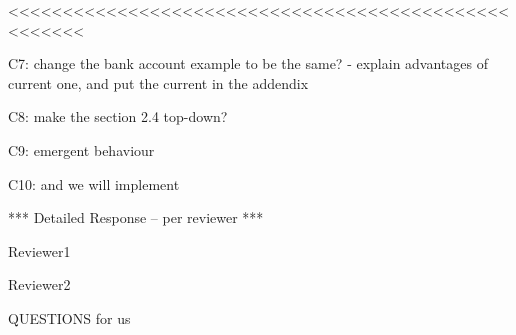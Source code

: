 <<<<<<<<<<<<<<<<<<<<<<<<<<<<<<<<<<<<<<<<<<<<<<<<<<<<<

C7: change the bank account example to be the same?
- explain advantages of current one, and put the current in the addendix

C8: make the section 2.4 top-down?

C9: emergent behaviour 

C10: and we will implement
 


*** Detailed Response -- per reviewer ***

Reviewer1

Reviewer2


QUESTIONS for us